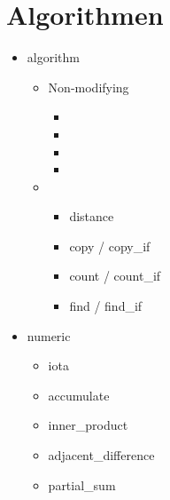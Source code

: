 \section{Algorithmen}
\begin{itemize}
	\item algorithm
		\begin{itemize}
			\item Non-modifying
				\begin{itemize}
					\item 
					\item
					\item
					\item
				\end{itemize}
			\item 
				\begin{itemize}
					\item distance
					\item copy / copy\_if
					\item count / count\_if
					\item \label{find} find / find\_if
				\end{itemize}
		\end{itemize}
	\item numeric
		\begin{itemize}
			\item iota
			\item accumulate
			\item inner\_product
			\item adjacent\_difference
			\item partial\_sum
		\end{itemize}
\end{itemize}
